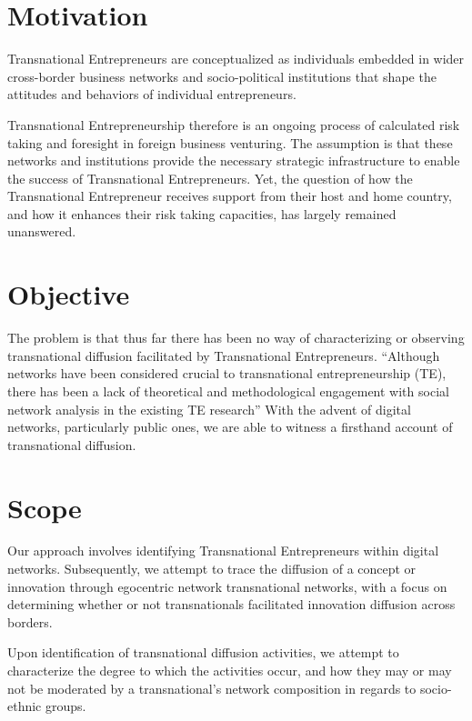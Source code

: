 \section{Motivation}
Transnational Entrepreneurs are conceptualized as individuals embedded
in wider cross-border business networks and socio-political
institutions that shape the attitudes and behaviors of individual
entrepreneurs.

Transnational Entrepreneurship therefore is an ongoing process of
calculated risk taking and foresight in foreign business
venturing. The assumption is that these networks and institutions
provide the necessary strategic infrastructure to enable the success
of Transnational Entrepreneurs. Yet, the question of how the
Transnational Entrepreneur receives support from their host and home
country, and how it enhances their risk taking capacities, has
largely remained unanswered.

\section{Objective}
The problem is that thus far there has been no way of characterizing
or observing transnational diffusion facilitated by Transnational
Entrepreneurs. ``Although networks have been considered crucial to
transnational entrepreneurship (TE), there has been a lack of
theoretical and methodological engagement with social network analysis
in the existing TE research''\cite{Chen.2009} With the advent of
digital networks, particularly public ones, we are able to witness a
firsthand account of transnational diffusion.

\section{Scope}
Our approach involves identifying Transnational Entrepreneurs within
digital networks. Subsequently, we attempt to trace the diffusion of a
concept or innovation through egocentric network transnational
networks, with a focus on determining whether or not transnationals
facilitated innovation diffusion across borders.

Upon identification of transnational diffusion activities, we attempt
to characterize the degree to which the activities occur, and how they
may or may not be moderated by a transnational's network composition
in regards to socio-ethnic groups.
